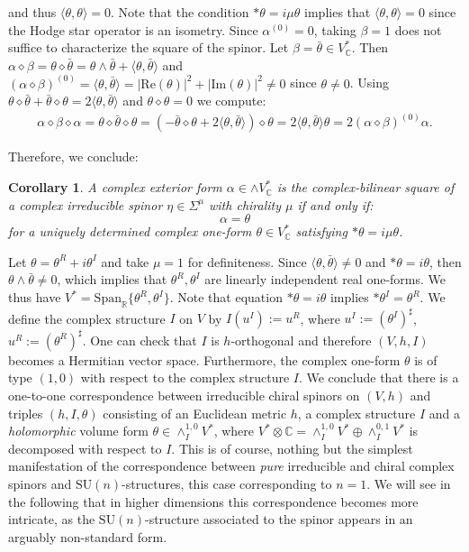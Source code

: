 \documentclass[10pt,a4paper,twoside,reqno]{amsart}
\theoremstyle{plain}
\newtheorem{cor}[thm]{Corollary}
\theoremstyle{definition}
\theoremstyle{remark}
\def\C{\mathbb{C}}
\def\R{\mathbb{R}}
\def\SU{\mathrm{SU}}
\def\Re{\mathrm{Re}}
\def\Im{\mathrm{Im}}
\def\R{\mathbb{R}}
\newcommand{\abs}[1]{\left\lvert#1\right\rvert}
\newcommand{\escal}[1]{\langle#1\rangle}
\def\Span{\mathrm{Span}}
\begin{document}
\noindent
and thus $\escal{\theta,\theta}=0$. Note that the condition $*\theta=i\mu\theta$ implies that $\escal{\theta,\theta}=0$ since the Hodge star operator is an isometry. Since $\alpha^{(0)}=0$, taking $\beta=1$ does not suffice to characterize the square of the spinor. Let $\beta=\bar\theta\in V^*_\C$. Then $\alpha \diamond \beta = \theta \diamond \bar\theta = \theta \wedge \bar \theta +\escal{\theta,\bar\theta}$ and $(\alpha \diamond \beta)^{(0)} =\escal{\theta,\bar\theta} = \abs{\Re(\theta)}^2 + \abs{\Im(\theta)}^2 \neq0$ since $\theta\neq 0$. Using $\theta\diamond\bar\theta+\bar\theta\diamond\theta=2\escal{\theta,\bar\theta}$ and $\theta\diamond\theta=0$ we compute:
\begin{eqnarray*}
\alpha\diamond\beta\diamond\alpha=\theta\diamond\bar\theta\diamond\theta=(-\bar\theta\diamond\theta+2\escal{\theta,\bar\theta})\diamond\theta=2\escal{\theta,\bar\theta}\theta=2(\alpha\diamond\beta)^{(0)}\alpha.
\end{eqnarray*}
 
\noindent
Therefore, we conclude:

\begin{cor}
A complex exterior form $\alpha\in\wedge V^*_\C$ is the complex-bilinear square of a complex irreducible spinor $\eta\in\Sigma^{\mu}$ with chirality $\mu$ if and only if: $$\alpha=\theta$$ for a uniquely determined complex one-form $\theta\in V^*_\C$ satisfying $*\theta=i\mu\theta$.
\end{cor}

\noindent
Let $\theta=\theta^R+i\theta^I$ and take $\mu =1$ for definiteness. Since $\escal{\theta,\bar\theta}\neq 0$ and $*\theta=i \theta$, then $\theta \wedge \bar\theta \neq 0$, which implies that $\theta^R,\theta^I$ are linearly independent real one-forms. We thus have $V^*=\Span_\R\{\theta^R,\theta^I\}$. Note that equation $*\theta=i\theta$ implies $*\theta^I = \theta^R$. We define the complex structure $I$ on $V$ by $I(u^I):= u^R$, where $u^I:=(\theta^I)^\sharp$, $u^R:=(\theta^R)^\sharp$. One can check that $I$ is $h$-orthogonal and therefore $(V,h,I)$ becomes a Hermitian vector space. Furthermore, the complex one-form $\theta$ is of type $(1,0)$ with respect to the complex structure $I$. We conclude that there is a one-to-one correspondence between irreducible chiral spinors on $(V,h)$ and triples $(h,I,\theta)$ consisting of an Euclidean metric $h$, a complex structure $I$ and a \emph{holomorphic} volume form $\theta \in \wedge^{1,0}_I V^{\ast}$, where $V^{\ast} \otimes \C = \wedge^{1,0}_I V^{\ast} \oplus \wedge^{0,1}_I V^{\ast}$ is decomposed with respect to $I$. This is of course, nothing but the simplest manifestation of the correspondence between \emph{pure} irreducible and chiral complex spinors and $\SU(n)$-structures, this case corresponding to $n=1$. We will see in the following that in higher dimensions this correspondence becomes more intricate, as the $\SU(n)$-structure associated to the spinor appears in an arguably non-standard form.
\end{document}
